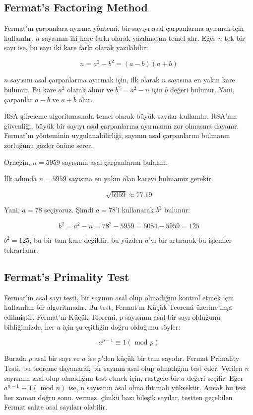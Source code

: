 \subsection{Fermat's Factoring Method}

Fermat'ın çarpanlara ayırma yöntemi, bir sayıyı asal çarpanlarına ayırmak için kullanılır. $n$ sayısının iki kare farkı olarak yazılmasını temel alır. Eğer $n$ tek bir sayı ise, bu sayı iki kare farkı olarak yazılabilir:

\[ n = a^2 - b^2 = (a - b)(a + b) \]

$n$ sayısını asal çarpanlarına ayırmak için, ilk olarak $n$ sayısına en yakın kare bulunur. Bu kare $a^2$ olarak alınır ve $b^2 = a^2 - n$ için $b$ değeri bulunur. Yani, çarpanlar $a - b$ ve $a + b$ olur. 

RSA şifreleme algoritmasında temel olarak büyük sayılar kullanılır. RSA’nın güvenliği, büyük bir sayıyı asal çarpanlarına ayırmanın zor olmasına dayanır. Fermat’ın yönteminin uygulanabilirliği, sayının asal çarpanlarını bulmanın zorluğunu gözler önüne serer.

Örneğin, $n = 5959$ sayısının asal çarpanlarını bulalım.

İlk adımda $n = 5959$ sayısına en yakın olan kareyi bulmamız gerekir.

\[ \sqrt{5959} \approx 77.19 \]

Yani, $a = 78$ seçiyoruz. Şimdi $a = 78$'i kullanarak $b^2$ bulunur:

\[ b^2 = a^2 - n = 78^2 - 5959 = 6084 - 5959 = 125 \]

$b^2 = 125$, bu bir tam kare değildir, bu yüzden $a$'yı bir artırarak bu işlemler tekrarlanır.

\newpage

\subsection{Fermat's Primality Test}

Fermat'ın asal sayı testi, bir sayının asal olup olmadığını kontrol etmek için kullanılan bir algoritmadır. Bu test, Fermat'ın Küçük Teoremi üzerine inşa edilmiştir. Fermat'ın Küçük Teoremi, $p$ sayısının asal bir sayı olduğunu bildiğimizde, her $a$ için şu eşitliğin doğru olduğunu söyler:

\[ a^{p-1} \equiv 1 (\text{ mod } p) \]

Burada $p$ asal bir sayı ve $a$ ise $p$'den küçük bir tam sayıdır. Fermat Primality Testi, bu teoreme dayanarak bir sayının asal olup olmadığını test eder. Verilen $n$ sayısının asal olup olmadığını test etmek için, rastgele bir $a$ değeri seçilir. Eğer $a^{n-1} \equiv 1 (\text{ mod } n)$ ise, n sayısının asal olma ihtimali yüksektir. Ancak bu test her zaman doğru sonu. vermez, çünkü bazı bileşik sayılar, testten geçebilen Fermat sahte asal sayıları olabilir.


